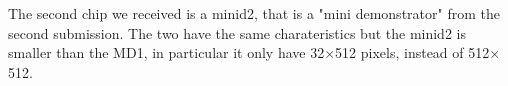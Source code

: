 

    The second chip we received is a minid2, that is a "mini demonstrator" from the second submission. The two have the same charateristics but the minid2 is smaller than the MD1, in particular it only have 32$\times$512 pixels, instead of 512$\times$512.  

